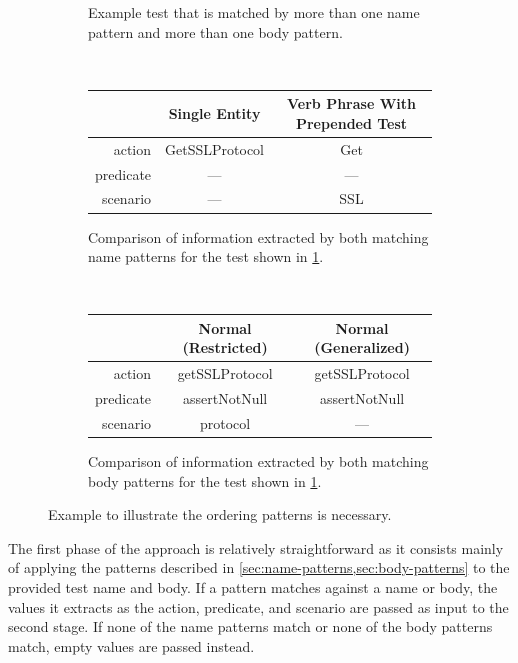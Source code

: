 \documentclass[proposal.tex]{subfiles}
\begin{document}
\begin{figure}[t]
    \centering
    \begin{subfigure}{0.9\textwidth}
        \caption{Example test that is matched by more than one name pattern and more than one body pattern.}
        \label{fig:approach-0}
    \end{subfigure}
    \\[1ex]
        \begin{subfigure}[b]{\columnwidth}
            \centering
            \begin{tabular}{rcc}
            \toprule
                      & Single Entity  & Verb Phrase With Prepended Test \\
            \midrule
            action    & GetSSLProtocol & Get \\
            predicate & ---            & --- \\
            scenario  & ---            & SSL \\
            \bottomrule
            \end{tabular}
            \caption{Comparison of information extracted by both matching name patterns for the test shown in \cref{fig:approach-0}.}
            \label{fig:approach-1}
        \end{subfigure}
    \\[1ex]
    \begin{subfigure}[b]{\columnwidth}
        \centering
        \begin{tabular}{rcc}
        \toprule
                  & Normal (Restricted) & Normal (Generalized) \\
        \midrule
        action    & getSSLProtocol    & getSSLProtocol \\
        predicate & assertNotNull     & assertNotNull \\
        scenario  & protocol          & --- \\
        \bottomrule
        \end{tabular}
        \caption{Comparison of information extracted by both matching body patterns for the test shown in \cref{fig:approach-0}.}
        \label{fig:approach-2}
    \end{subfigure}    
    \caption{Example to illustrate the ordering patterns is necessary.}
    \label{fig:approach-example}
\end{figure}

The first phase of the approach is relatively straightforward as it consists mainly of applying the patterns described in \cref{sec:name-patterns,sec:body-patterns} to the provided test name and body.
%
If a pattern matches against a name or body, the values it extracts as the action, predicate, and scenario are passed as input to the second stage.
%
If none of the name patterns match or none of the body patterns match, empty values are passed instead.
\end{document}

